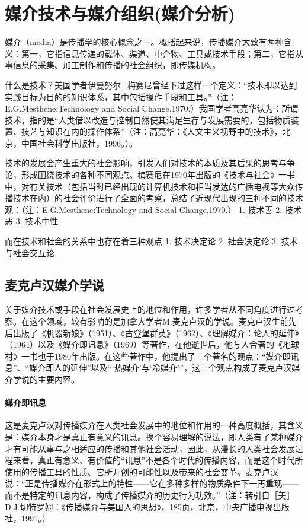 \documentclass[UTF8,12pt]{ctexart}
\numberwithin{equation}{section} %
\numberwithin{figure}{section}
\numberwithin{table}{section}
\begin{document}
	\newpage
	
	\section{媒介技术与媒介组织(媒介分析)}
	媒介（media）是传播学的核心概念之一。概括起来说，传播媒介大致有两种含义：第一，它指信息传递的载体、渠道、中介物、工具或技术手段；第二，它指从事信息的采集、加工制作和传播的社会组织，即传媒机构。
	
	什么是技术？美国学者伊曼努尔·梅赛尼曾经下过这样一个定义：“技术即以达到实践目标为目的的知识体系，其中包括操作手段和工具。”（注：E.G.Mesthene:Technology and Social Change,1970.）我国学者高亮华认为：所谓技术，指的是“人类借以改造与控制自然使其满足生存与发展需要的，包括物质装置、技艺与知识在内的操作体系”（注：高亮华：《人文主义视野中的技术》，北京，中国社会科学出版社，1996。）。
	
	技术的发展会产生重大的社会影响，引发人们对技术的本质及其后果的思考与争论，形成围绕技术的各种不同观点。梅赛尼在1970年出版的《技术与社会》一书中，对有关技术（包括当时已经出现的计算机技术和相当发达的广播电视等大众传播技术在内）的社会评价进行了全面的考察，总结了近现代出现的三种不同的技术观：（注：E.G.Mesthene:Technology and Social Change,1970.）
	1. 技术善
	2. 技术恶
	3. 技术中性
	
	而在技术和社会的关系中也存在着三种观点
	1. 技术决定论
	2. 社会决定论
	3. 技术与社会交互论
	
	\subsection{麦克卢汉媒介学说}
	
	关于媒介技术或手段在社会发展史上的地位和作用，许多学者从不同角度进行过考察。在这个领域，较有影响的是加拿大学者M.麦克卢汉的学说。麦克卢汉生前先后出版了《机器新娘》（1951）、《古登堡群英》（1962）、《理解媒介：论人的延伸》（1964）以及《媒介即讯息》（1969）等著作，在他逝世后，他与人合著的《地球村》一书也于1980年出版。在这些著作中，他提出了三个著名的观点：“媒介即讯息”、“媒介即人的延伸”以及“‘热媒介’与‘冷媒介’”，这三个观点构成了麦克卢汉媒介学说的主要内容。
	
	\paragraph{媒介即讯息}
	
	这是麦克卢汉对传播媒介在人类社会发展中的地位和作用的一种高度概括，其含义是：媒介本身才是真正有意义的讯息。换个容易理解的说法，即人类有了某种媒介才有可能从事与之相适应的传播和其他社会活动，因此，从漫长的人类社会发展过程来看，真正有意义、有价值的“讯息”不是各个时代的传播内容，而是这个时代所使用的传播工具的性质、它所开创的可能性以及带来的社会变革。麦克卢汉说：“正是传播媒介在形式上的特性——它在多种多样的物质条件下一再重现——而不是特定的讯息内容，构成了传播媒介的历史行为功效。”（注：转引自［美］D.J.切特罗姆：《传播媒介与美国人的思想》，185页，北京，中央广播电视出版社，1991。）
	
\end{document}
